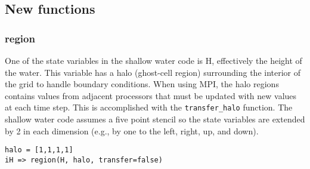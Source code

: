 \subsection{New functions}

\subsubsection{region}

One of the state variables in the shallow water code is H, effectively the
height of the water.  This variable has a halo (ghost-cell region) surrounding
the interior of the grid to handle boundary conditions.  When using
MPI, the halo regions contains values from adjacent processors that must be
updated with new values at each time step.  This is accomplished with the
{\tt transfer\_halo} function.  The shallow water code assumes a five point stencil
so the state variables are extended by 2 in each dimension (e.g., by one to the
left, right, up, and down).

\begin{verbatim}
halo = [1,1,1,1]
iH => region(H, halo, transfer=false)
\end{verbatim}
